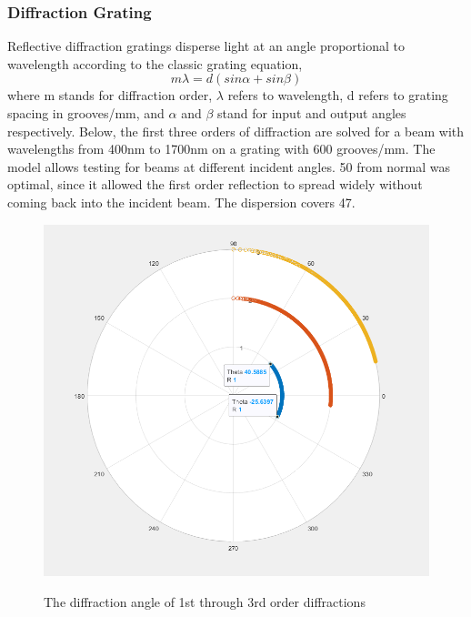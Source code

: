 \documentclass[journal]{IEEEtran}
\begin{document}
\subsubsection{Diffraction Grating}
Reflective diffraction gratings disperse light at an angle proportional to wavelength according to the classic grating equation,
\begin{equation}
    m\lambda = d(sin\alpha + sin\beta)
\end{equation}
where m stands for diffraction order, $\lambda$ refers to wavelength, d refers to grating spacing in grooves/mm, and $\alpha$ and $\beta$ stand for input and output angles respectively. Below, the first three orders of diffraction are solved for a beam with wavelengths from 400nm to 1700nm on a grating with 600 grooves/mm. The model allows testing for beams at different incident angles. 50\textdegree \: from normal was optimal, since it allowed the first order reflection to spread widely without coming back into the incident beam. The dispersion covers 47\textdegree.
\begin{figure}[H]
    \centering
    \includegraphics[width=\linewidth]{images/DiffractionAngleCalculator.png}
    \label{fig:diffraction-angle}
    \caption{The diffraction angle of 1st through 3rd order diffractions}
\end{figure}
\end{document}
